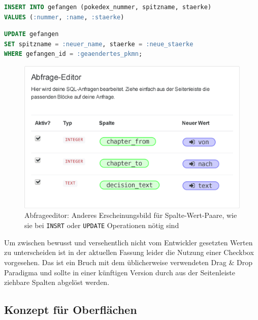 \begin{lstlisting}[language=SQL,float=h!,caption={Syntax einer \texttt{INSERT}-Anweisung}, label={lst:sql-syntax-insert}]
INSERT INTO gefangen (pokedex_nummer, spitzname, staerke)
VALUES (:nummer, :name, :staerke)
\end{lstlisting}

\begin{lstlisting}[language=SQL,float=h!,caption={Syntax einer \texttt{UPDATE}-Anweisung}, label={lst:sql-syntax-update}]
UPDATE gefangen
SET spitzname = :neuer_name, staerke = :neue_staerke
WHERE gefangen_id = :geaendertes_pkmn;
\end{lstlisting}

\begin{figure}[h]
  \includegraphics[width=\textwidth]{images/sql-insert-key-value-pairs}
  \caption{Abfrageeditor: Anderes Erscheinungsbild für Spalte-Wert-Paare, wie sie bei \texttt{INSRT} oder \texttt{UPDATE} Operationen nötig sind}
  \label{fig:screen-sql-editor-insert-key-value-pairs}
\end{figure}

Um zwischen bewusst und versehentlich nicht vom Entwickler gesetzten Werten zu unterscheiden ist in der aktuellen Fassung leider die Nutzung einer Checkbox vorgesehen. Das ist ein Bruch mit dem üblicherweise verwendeten Drag \& Drop Paradigma und sollte in einer künftigen Version durch aus der Seitenleiste ziehbare Spalten abgelöst werden.

\subsection{Konzept für Oberflächen}
\label{sec:design-ui-concept}


